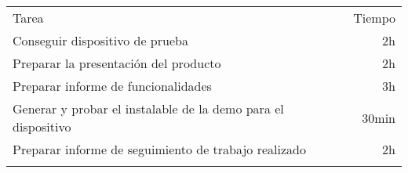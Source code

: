 \begin{enumerate}
  \begin{longtable}[c]{@{}lr@{}}
  \hline\noalign{\medskip}
  \begin{minipage}[b]{0.89\columnwidth}\raggedright
  Tarea
  \end{minipage} & \begin{minipage}[b]{0.11\columnwidth}\raggedleft
  Tiempo
  \end{minipage}
  \\\noalign{\medskip}
  \hline\noalign{\medskip}
  \begin{minipage}[t]{0.89\columnwidth}\raggedright
  Conseguir dispositivo de prueba
  \end{minipage} & \begin{minipage}[t]{0.11\columnwidth}\raggedleft
  2h
  \end{minipage}
  \\\noalign{\medskip}
  \begin{minipage}[t]{0.89\columnwidth}\raggedright
  Preparar la presentación del producto
  \end{minipage} & \begin{minipage}[t]{0.11\columnwidth}\raggedleft
  2h
  \end{minipage}
  \\\noalign{\medskip}
  \begin{minipage}[t]{0.89\columnwidth}\raggedright
  Preparar informe de funcionalidades
  \end{minipage} & \begin{minipage}[t]{0.11\columnwidth}\raggedleft
  3h
  \end{minipage}
  \\\noalign{\medskip}
  \begin{minipage}[t]{0.89\columnwidth}\raggedright
  Generar y probar el instalable de la demo para el dispositivo
  \end{minipage} & \begin{minipage}[t]{0.11\columnwidth}\raggedleft
  30min
  \end{minipage}
  \\\noalign{\medskip}
  \begin{minipage}[t]{0.89\columnwidth}\raggedright
  Preparar informe de seguimiento de trabajo realizado
  \end{minipage} & \begin{minipage}[t]{0.11\columnwidth}\raggedleft
  2h
  \end{minipage}
  \\\noalign{\medskip}
  \begin{minipage}[t]{0.89\columnwidth}\raggedright

\end{minipage}
\end{longtable}
\end{enumerate}
